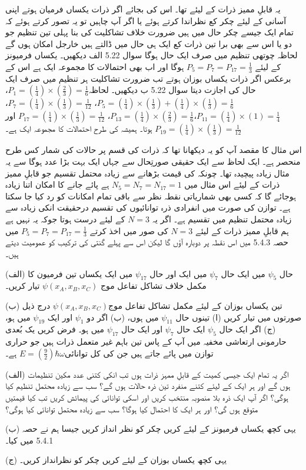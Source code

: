 یہ قابلِ ممیز ذرات کے لیئے تھا۔ اس کی بجائے اگر ذرات یکساں فرمیان ہوتے اپنی آسانی کے لیئے چکر کع نظراندا کرتے ہوئے یا اگر آپ چاہیں تو یہ تصور کرتے ہوئے کہ تمام ایک جیسے چکر حال میں ہیں ضرورت خلاف تشاکلیت کی بنا پہلی تین تنظیم جو دو یا اس سے بھی برا تین ذرات کع ایک ہی حال میں ڈالتے ہیں خارجل امکان ہوں گے لحاظہ چوتھی تنظیم میں صرف ایک حال ہوگا سوال \num{5.22} الف دیکھیں۔ یکساں فرمیونز کے لیئے \(P_5 = P_7 = P_{17} = \frac{1}{3}\) ہوگا اور اب بھی احتمالات کا مجموعہ ایک ہے اس کے برعکس اگر ذرات یکساں بوزان ہوتے تب ضرورت تشاکلیت ہر تنظیم میں صرف ایک حال کی اجازت دیتا سوال \num{5.22} ب دیکھیں۔ لحاظہ\(P_1 = (\frac{1}{4})\times(\frac{2}{3}) = \frac{1}{6}\)، \(P_5 = (\frac{1}{4})\times(\frac{1}{3}) + (\frac{1}{4})\times(\frac{1}{3}) = \frac{1}{6}\)، \(P_7 = (\frac{1}{4})\times(\frac{1}{3}) = \frac{1}{12}\)، \(P_{11} = (\frac{1}{4})\times(1) = \frac{1}{4}\)،\(P_{13} = (\frac{1}{4})\times(\frac{2}{3}) = \frac{1}{6}\)، \(P_{17} = (\frac{1}{4})\times(\frac{1}{3}) = \frac{1}{12}\) اور \(P_{19} = (\frac{1}{4})\times(\frac{1}{3}) = \frac{1}{12}\) ہوتا۔ ہمیشہ کی طرح احتمالات کا مجموعہ ایک ہے۔

اس مثال کا مقصد آپ کو یہ دیکھانا تھا کہ ذرات کی قسم پر حالات کی شمار کس طرح منحصر ہے۔ ایک لحاظ سے ایک حقیقی صورتِحال سے جہاں  ایک بہت بڑا عدد ہوگا سے یہ مثال زیادہ پیچیدہ تھا۔ چونکہ  کی قیمت بڑھانے سے زیادہ محتمل تقسیم جو قابلِ ممیز ذرات کے لیئے اس مثال میں \(N_5 = N_7 = N_{17} = 1\) ہے پائے جانے کا امکان اتنا زیادہ ہوجائے گا کہ کسی بھی شماریاتی نقطہ نظر سے باقی تمام امکانات کو رد کیا جا سکتا ہے۔ توازن کی صورت میں انفرادی ذرہ توانائیوں کی تقسیم درحقیقت انکی زیادہ سے زیادہ محتمل تنظیم میں تقسیم ہے۔ اگر یہ \(N = 3\)  کے لیئے درست ہوتا جوکہ یہ نہیں ہے ہم قابلِ ممیز ذرات کے لیئے \(N = 3\) کی صور میں اخذ کرتے \(P_5 = P_7 = P_{17} = \frac{1}{3}\) میں حصہ 5.4.3 میں اس نقطہ پر دوبارہ آؤں گا لیکن اس سے پہلے گنتی کی ترکیب کو عمومیت دیتے ہیں۔


(الف) حال \(\psi_5\) میں ایک حال \(\psi_7\) میں ایک اور حال \(\psi_{17}\) میں ایک یکساں تین فرمیون کا مکمل خلاف تشاکل تفاعل موج \(\psi(x_A, x_B, x_C)\) تیار کریں۔

(ب) تین یکساں بوزان کے لیئے مکمل تشاکل تفاعل موج\(\psi(x_A, x_B, x_C)\) درج ذیل صورتوں میں تیار کریں (ا) تینوں حال \(\psi_{11}\) میں ہوں، (ب) اگر دو \(\psi_1\) اور ایک \(\psi_{19}\) میں ہو، (ج) اگر ایک حال \(\psi_5\) ایک حال \(\psi_7\) اور ایک حال \(\psi_{17}\) میں ہو۔ 
فرض کریں یک بُعدی حارمونی ارتعاشی مخفیہ میں آپ کے پاس تین باہم غیر متعمل ذرات ہیں جو حراری توازن میں پائے جاتے ہیں جن کی کل توانائی\(E = (\frac{9}{2})\hbar\omega\) ہے۔

(الف) اگر یہ تمام ایک جیسی کمیت کے قابلِ ممہز ذرات ہوں تب انکی کتنی عدد مکین تنظیمات ہوں گے اور ہر ایک کے لیئے کتنے منفرد تین ذرہ حالات ہوں گے؟ سب سے زیادہ محتمل تنظیم کیا ہوگی؟ اگر آپ ایک ذرہ بلا منصوبہ منتخب کریں اور اسکی توانائی کی پیمائش کریں تب کیا قیمتیں متوقع ہوں گی؟ اور ہر ایک کا احتمال کیا ہوگا؟ سب سے زیادہ محتمل توانائی کیا ہوگی؟

(ب) یہی کچھ یکساں فرمیونز کے لیئے کریں چکر کو نظر انداز کریں جیسا ہم نے حصہ 5.4.1 میں کیا۔

(ج) یہی کچھ یکساں بوزان کے لیئے کریں چکر کو نظرانداز کریں۔ 

